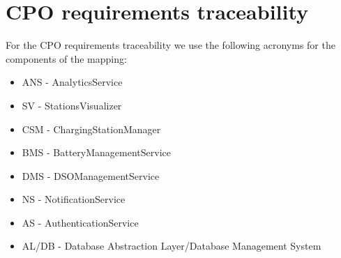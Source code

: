 \section{CPO requirements traceability}
For the CPO requirements traceability we use the following acronyms for the components of the mapping:
\begin{itemize}
    \item ANS - AnalyticsService
    \item SV - StationsVisualizer
    \item CSM - ChargingStationManager
    \item BMS - BatteryManagementService
    \item DMS - DSOManagementService
    \item NS - NotificationService
    \item AS - AuthenticationService
    \item AL/DB - Database Abstraction Layer/Database Management System
\end{itemize}
